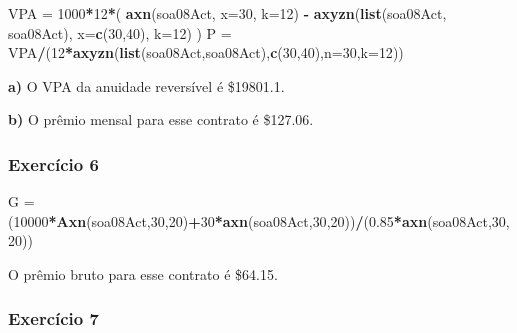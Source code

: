 \documentclass[]{article}
\newenvironment{Shaded}{\begin{snugshade}}{\end{snugshade}}
\newcommand{\DataTypeTok}[1]{\textcolor[rgb]{0.13,0.29,0.53}{#1}}
\newcommand{\DecValTok}[1]{\textcolor[rgb]{0.00,0.00,0.81}{#1}}
\newcommand{\FloatTok}[1]{\textcolor[rgb]{0.00,0.00,0.81}{#1}}
\newcommand{\KeywordTok}[1]{\textcolor[rgb]{0.13,0.29,0.53}{\textbf{#1}}}
\newcommand{\NormalTok}[1]{#1}
\newcommand{\OperatorTok}[1]{\textcolor[rgb]{0.81,0.36,0.00}{\textbf{#1}}}
\newcommand{\StringTok}[1]{\textcolor[rgb]{0.31,0.60,0.02}{#1}}
\begin{document}
\begin{Shaded}
\begin{Highlighting}[]
\NormalTok{VPA =}\StringTok{ }\DecValTok{1000}\OperatorTok{*}\DecValTok{12}\OperatorTok{*}\NormalTok{( }\KeywordTok{axn}\NormalTok{(soa08Act, }\DataTypeTok{x=}\DecValTok{30}\NormalTok{, }\DataTypeTok{k=}\DecValTok{12}\NormalTok{) }\OperatorTok{-}\StringTok{ }\KeywordTok{axyzn}\NormalTok{(}\KeywordTok{list}\NormalTok{(soa08Act, soa08Act), }\DataTypeTok{x=}\KeywordTok{c}\NormalTok{(}\DecValTok{30}\NormalTok{,}\DecValTok{40}\NormalTok{), }\DataTypeTok{k=}\DecValTok{12}\NormalTok{) )}
\NormalTok{P =}\StringTok{ }\NormalTok{VPA}\OperatorTok{/}\NormalTok{(}\DecValTok{12}\OperatorTok{*}\KeywordTok{axyzn}\NormalTok{(}\KeywordTok{list}\NormalTok{(soa08Act,soa08Act),}\KeywordTok{c}\NormalTok{(}\DecValTok{30}\NormalTok{,}\DecValTok{40}\NormalTok{),}\DataTypeTok{n=}\DecValTok{30}\NormalTok{,}\DataTypeTok{k=}\DecValTok{12}\NormalTok{))}
\end{Highlighting}
\end{Shaded}

\textbf{a)} O VPA da anuidade reversível é \$19801.1.

\textbf{b)} O prêmio mensal para esse contrato é \$127.06.

\hypertarget{exercicio-6}{%
\subsubsection{Exercício 6}\label{exercicio-6}}

\begin{Shaded}
\begin{Highlighting}[]
\NormalTok{G =}\StringTok{ }\NormalTok{(}\DecValTok{10000}\OperatorTok{*}\KeywordTok{Axn}\NormalTok{(soa08Act,}\DecValTok{30}\NormalTok{,}\DecValTok{20}\NormalTok{)}\OperatorTok{+}\DecValTok{30}\OperatorTok{*}\KeywordTok{axn}\NormalTok{(soa08Act,}\DecValTok{30}\NormalTok{,}\DecValTok{20}\NormalTok{))}\OperatorTok{/}\NormalTok{(}\FloatTok{0.85}\OperatorTok{*}\KeywordTok{axn}\NormalTok{(soa08Act,}\DecValTok{30}\NormalTok{,}\DecValTok{20}\NormalTok{))}
\end{Highlighting}
\end{Shaded}

O prêmio bruto para esse contrato é \$64.15.

\hypertarget{exercicio-7}{%
\subsubsection{Exercício 7}\label{exercicio-7}}
\end{document}
